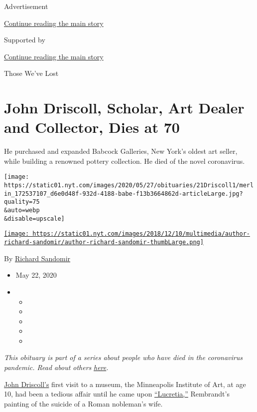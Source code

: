 Advertisement

\protect\hyperlink{after-top}{Continue reading the main story}

Supported by

\protect\hyperlink{after-sponsor}{Continue reading the main story}

Those We've Lost

\hypertarget{john-driscoll-scholar-art-dealer-and-collector-dies-at-70}{%
\section{John Driscoll, Scholar, Art Dealer and Collector, Dies at
70}\label{john-driscoll-scholar-art-dealer-and-collector-dies-at-70}}

He purchased and expanded Babcock Galleries, New York's oldest art
seller, while building a renowned pottery collection. He died of the
novel coronavirus.

\texttt{[image: https://static01.nyt.com/images/2020/05/27/obituaries/21Driscoll1/merlin\_172537107\_d6e0d48f-932d-4188-babe-f13b3664862d-articleLarge.jpg?quality=75\\\&auto=webp\\\&disable=upscale]}

\href{https://www.nytimes.com/by/richard-sandomir}{\texttt{[image: https://static01.nyt.com/images/2018/12/10/multimedia/author-richard-sandomir/author-richard-sandomir-thumbLarge.png]}}

By \href{https://www.nytimes.com/by/richard-sandomir}{Richard Sandomir}

\begin{itemize}
\item
  May 22, 2020
\item
  \begin{itemize}
  \item
  \item
  \item
  \item
  \item
  \end{itemize}
\end{itemize}

\emph{This obituary is part of a series about people who have died in
the coronavirus pandemic. Read about others}
\href{https://www.nytimes.com/interactive/2020/obituaries/people-died-coronavirus-obituaries.html}{\emph{here}}\emph{.}

\href{http://www.driscollbabcock.com/exhibitions/installation/john-driscoll-1949-2020\#works}{John
Driscoll's} first visit to a museum, the Minneapolis Institute of Art,
at age 10, had been a tedious affair until he came upon
\href{https://collections.artsmia.org/art/529/lucretia-rembrandt-harmensz-van-rijn}{``Lucretia,''}
Rembrandt's painting of the suicide of a Roman nobleman's wife.

